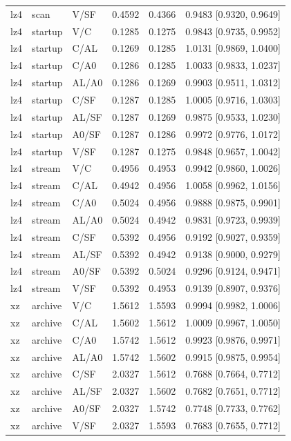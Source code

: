 \begin{longtable}{lllrrl}
lz4 & scan & V/SF & 0.4592 & 0.4366 & 0.9483 [0.9320, 0.9649] \\
lz4 & startup & V/C & 0.1285 & 0.1275 & 0.9843 [0.9735, 0.9952] \\
lz4 & startup & C/AL & 0.1269 & 0.1285 & 1.0131 [0.9869, 1.0400] \\
lz4 & startup & C/A0 & 0.1286 & 0.1285 & 1.0033 [0.9833, 1.0237] \\
lz4 & startup & AL/A0 & 0.1286 & 0.1269 & 0.9903 [0.9511, 1.0312] \\
lz4 & startup & C/SF & 0.1287 & 0.1285 & 1.0005 [0.9716, 1.0303] \\
lz4 & startup & AL/SF & 0.1287 & 0.1269 & 0.9875 [0.9533, 1.0230] \\
lz4 & startup & A0/SF & 0.1287 & 0.1286 & 0.9972 [0.9776, 1.0172] \\
lz4 & startup & V/SF & 0.1287 & 0.1275 & 0.9848 [0.9657, 1.0042] \\
lz4 & stream & V/C & 0.4956 & 0.4953 & 0.9942 [0.9860, 1.0026] \\
lz4 & stream & C/AL & 0.4942 & 0.4956 & 1.0058 [0.9962, 1.0156] \\
lz4 & stream & C/A0 & 0.5024 & 0.4956 & 0.9888 [0.9875, 0.9901] \\
lz4 & stream & AL/A0 & 0.5024 & 0.4942 & 0.9831 [0.9723, 0.9939] \\
lz4 & stream & C/SF & 0.5392 & 0.4956 & 0.9192 [0.9027, 0.9359] \\
lz4 & stream & AL/SF & 0.5392 & 0.4942 & 0.9138 [0.9000, 0.9279] \\
lz4 & stream & A0/SF & 0.5392 & 0.5024 & 0.9296 [0.9124, 0.9471] \\
lz4 & stream & V/SF & 0.5392 & 0.4953 & 0.9139 [0.8907, 0.9376] \\
xz & archive & V/C & 1.5612 & 1.5593 & 0.9994 [0.9982, 1.0006] \\
xz & archive & C/AL & 1.5602 & 1.5612 & 1.0009 [0.9967, 1.0050] \\
xz & archive & C/A0 & 1.5742 & 1.5612 & 0.9923 [0.9876, 0.9971] \\
xz & archive & AL/A0 & 1.5742 & 1.5602 & 0.9915 [0.9875, 0.9954] \\
xz & archive & C/SF & 2.0327 & 1.5612 & 0.7688 [0.7664, 0.7712] \\
xz & archive & AL/SF & 2.0327 & 1.5602 & 0.7682 [0.7651, 0.7712] \\
xz & archive & A0/SF & 2.0327 & 1.5742 & 0.7748 [0.7733, 0.7762] \\
xz & archive & V/SF & 2.0327 & 1.5593 & 0.7683 [0.7655, 0.7712] \\

\end{longtable}
